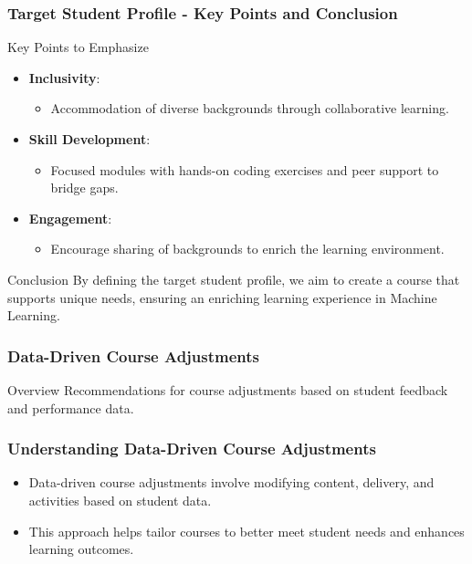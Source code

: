 \documentclass[aspectratio=169]{beamer}
\begin{document}
\begin{frame}[fragile]
    \frametitle{Target Student Profile - Key Points and Conclusion}
    \begin{block}{Key Points to Emphasize}
        \begin{itemize}
            \item \textbf{Inclusivity}:
                \begin{itemize}
                    \item Accommodation of diverse backgrounds through collaborative learning.
                \end{itemize}
            \item \textbf{Skill Development}:
                \begin{itemize}
                    \item Focused modules with hands-on coding exercises and peer support to bridge gaps.
                \end{itemize}
            \item \textbf{Engagement}:
                \begin{itemize}
                    \item Encourage sharing of backgrounds to enrich the learning environment.
                \end{itemize}
        \end{itemize}
    \end{block}
    
    \begin{block}{Conclusion}
        By defining the target student profile, we aim to create a course that supports unique needs, ensuring an enriching learning experience in Machine Learning.
    \end{block}
\end{frame}

\begin{frame}[fragile]
    \frametitle{Data-Driven Course Adjustments}
    \begin{block}{Overview}
        Recommendations for course adjustments based on student feedback and performance data.
    \end{block}
\end{frame}

\begin{frame}[fragile]
    \frametitle{Understanding Data-Driven Course Adjustments}
    \begin{itemize}
        \item Data-driven course adjustments involve modifying content, delivery, and activities based on student data.
        \item This approach helps tailor courses to better meet student needs and enhances learning outcomes.
    \end{itemize}
\end{frame}
\end{document}
